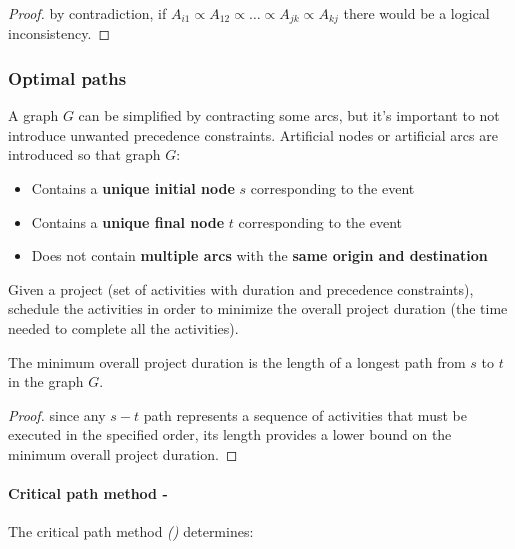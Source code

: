 \documentclass[english]{article}
\begin{document}
\begin{proof}
  by contradiction, if \(A_{i1} \propto A_{12} \propto \ldots \propto A_{jk} \propto A_{kj}\) there would be a logical inconsistency.
\end{proof}

\subsubsection{Optimal paths}

A graph \(G\) can be simplified by contracting some arcs, but it's important to not introduce unwanted precedence constraints.
Artificial nodes or artificial arcs are introduced so that graph \(G\):

\begin{itemize}
  \item Contains a \textbf{unique initial node} \(s\) corresponding to the event 
  \item Contains a \textbf{unique final node} \(t\) corresponding to the event 
  \item Does not contain \textbf{multiple arcs} with the \textbf{same origin and destination}
\end{itemize}

\bigskip
\begin{problem}
  Given a project (set of activities with duration and precedence constraints), schedule the activities in order to minimize the overall project duration (the time needed to complete all the activities).
\end{problem}

\bigskip
\begin{property}
  The minimum overall project duration is the length of a longest path from \(s\) to \(t\) in the graph \(G\).
\end{property}

\begin{proof}
  since any \(s-t\) path represents a sequence of activities that must be executed in the specified order, its length provides a lower bound on the minimum overall project duration.
\end{proof}

\paragraph{Critical path method - \CPM}

The critical path method \textit{(\CPM) } determines:
\end{document}
